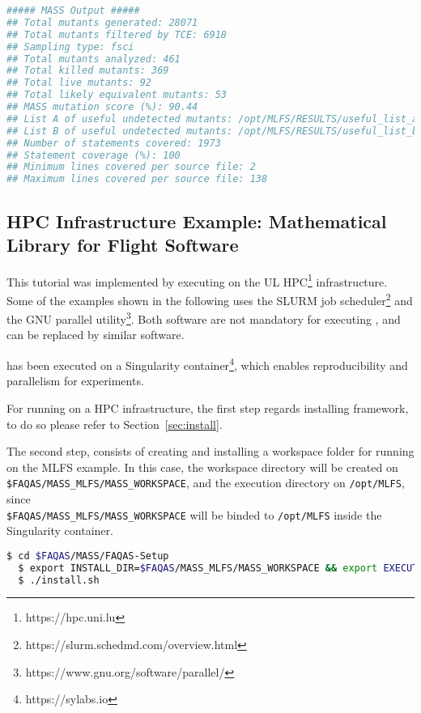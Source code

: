 \begin{lstlisting}[language=bash, label=mass_output, caption=\MASS output.]
##### MASS Output #####                                                                                                                   
## Total mutants generated: 28071
## Total mutants filtered by TCE: 6918
## Sampling type: fsci
## Total mutants analyzed: 461
## Total killed mutants: 369
## Total live mutants: 92
## Total likely equivalent mutants: 53
## MASS mutation score (%): 90.44
## List A of useful undetected mutants: /opt/MLFS/RESULTS/useful_list_a
## List B of useful undetected mutants: /opt/MLFS/RESULTS/useful_list_b
## Number of statements covered: 1973
## Statement coverage (%): 100
## Minimum lines covered per source file: 2
## Maximum lines covered per source file: 138
\end{lstlisting}


\subsection{HPC Infrastructure Example: Mathematical Library for Flight Software}

This tutorial was implemented by executing \MASS on the UL HPC\footnote{https://hpc.uni.lu} infrastructure.
 Some of the examples shown in the following uses the SLURM job scheduler\footnote{https://slurm.schedmd.com/overview.html} and the GNU parallel utility\footnote{https://www.gnu.org/software/parallel/}. Both software are not mandatory for executing \MASS, and can be replaced by similar software.

\MASS has been executed on a Singularity container\footnote{https://sylabs.io}, which enables reproducibility and parallelism for experiments.

For running \MASS on a HPC infrastructure, the first step regards installing \MASS framework, to do so please refer to Section~\ref{sec:install}.

The second step, consists of creating and installing a workspace folder for running \MASS on the MLFS example. In this case, the workspace directory will be created on \\\texttt{\$FAQAS/MASS\_MLFS/MASS\_WORKSPACE}, and the execution directory on \texttt{/opt/MLFS}, since \\\texttt{\$FAQAS/MASS\_MLFS/MASS\_WORKSPACE} will be binded to \texttt{/opt/MLFS} inside the Singularity container.

\begin{lstlisting}[language=bash]
  $ cd $FAQAS/MASS/FAQAS-Setup
  $ export INSTALL_DIR=$FAQAS/MASS_MLFS/MASS_WORKSPACE && export EXECUTION_DIR=/opt/MLFS 
  $ ./install.sh
\end{lstlisting}

